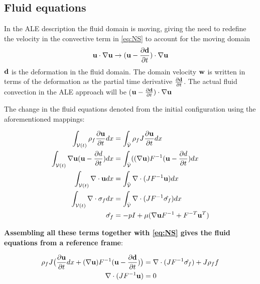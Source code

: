 \subsection{Fluid equations}
In the ALE description the fluid domain is moving, giving the need to redefine the velocity in the convective term in \eqref{eq:NS} to account for the moving domain 
\begin{equation}
\bold{u} \cdot \nabla \bold{u} \rightarrow (\bold{u}-\frac{\partial \bold{d}}{\partial t}) \cdot \nabla \bold{u}  
\end{equation}
$\bold{d}$ is the deformation in the fluid domain. The domain velocity $\bold{w}$ is written in terms of the deformation as the partial time derivative $\frac{\partial \bold{d}}{\partial t}$. The actual fluid convection in the ALE approach will be ($\bold{u}-\frac{\partial \bold{d}}{\partial t}) \cdot\nabla \bold{u}$ 

The change in the fluid equations denoted from the initial configuration using the aforementioned mappings:

\begin{align}
\int_{\mathcal{V}(t)} \rho_f \frac{\partial \bold{u}}{\partial t} dx & = \int_{\hat{\mathcal{V}}}  \rho_f J \frac{\partial \bold{u}}{\partial t} dx \\
\int_{\mathcal{V}(t)} \nabla \bold{u} (\bold{u}-\frac{\partial d}{\partial t}) dx  &= \int_{\hat{\mathcal{V}}} ((\nabla \bold{u})F^{-1}(\bold{u}-\frac{\partial d}{\partial t}) dx  \\
\int_{\mathcal{V}(t)} \nabla \cdot \bold{u} dx  &=\int_{\hat{\mathcal{V}}}  \nabla \cdot (J F^{-1} \bold{u}  ) dx \\
\int_{\mathcal{V}(t)} \nabla \cdot \sigma_f dx &= \int_{\hat{\mathcal{V}}} \nabla \cdot( J F^{-1} \hat{\sigma_f} )     dx \\
\hat{\sigma_f} &= -pI + \mu ( \nabla \bold{u} F^{-1} + F^{-T} \bold{u}^{T}  ) 
\end{align}

\textbf{Assembling all these terms together with \eqref{eq:NS} gives the fluid equations from a reference frame}:

\begin{align}
\label{eq:NS_mapped}
\rho_f J \big( \frac{\partial \bold{u}}{\partial t} dx + (\nabla \bold{u})F^{-1}(\bold{u}-\frac{\partial \bold{d}}{\partial t}) \big) &= \nabla \cdot( J F^{-1} \hat{\sigma_f} ) + J \rho_f f \\
\nabla \cdot (J F^{-1} \bold{u} ) &= 0
\end{align} 

